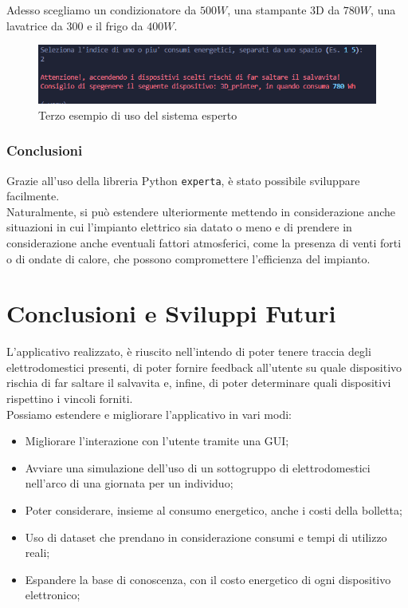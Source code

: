 \documentclass[12pt, letterpaper]{article}
\begin{document}
\noindent Adesso scegliamo un condizionatore da $500W$, una stampante 3D da $780W$, una
lavatrice da $300$ e il frigo da $400W$.

\begin{figure}[h]
      \centering
      \includegraphics[scale=0.8]{sistema-esperto-esempio-3.png}
      \caption{Terzo esempio di uso del sistema esperto}
\end{figure}

\subsubsection{Conclusioni}

Grazie all'uso della libreria Python \texttt{experta}, è stato possibile sviluppare facilmente. \\

\noindent Naturalmente, si può estendere ulteriormente mettendo in considerazione anche situazioni in cui
l'impianto elettrico sia datato o meno e di prendere in considerazione anche
eventuali fattori atmosferici, come la presenza di venti forti o di ondate di calore, che
possono compromettere l'efficienza del impianto.


\section{Conclusioni e Sviluppi Futuri}

L'applicativo realizzato, è riuscito nell'intendo di poter tenere traccia degli elettrodomestici
presenti, di poter fornire feedback all'utente su quale dispositivo rischia di far saltare il salvavita
e, infine, di poter determinare quali dispositivi rispettino i vincoli forniti. \\

\noindent Possiamo estendere e migliorare l'applicativo in vari modi:
\begin{itemize}
      \item Migliorare l'interazione con l'utente tramite una GUI;
      \item Avviare una simulazione dell'uso di un sottogruppo di elettrodomestici
            nell'arco di una giornata per un individuo;
      \item Poter considerare, insieme al consumo energetico, anche i costi della bolletta;
      \item Uso di dataset che prendano in considerazione consumi e tempi di utilizzo reali;
      \item Espandere la base di conoscenza, con il costo energetico di ogni dispositivo elettronico;
\end{itemize}
\end{document}
